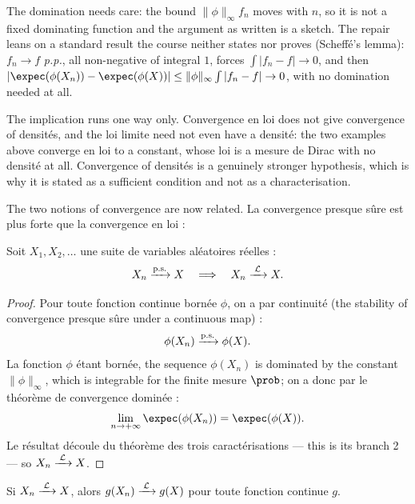 \begin{remark}
  The domination needs care: the bound $\|\phi\|_{\infty} f_{n}$ moves with
  $n$, so it is not a fixed dominating function and the argument as written is a
  sketch. The repair leans on a standard result the course neither states nor
  proves (Scheffé's lemma): $f_{n} \to f$ \textit{p.p.}, all non-negative of
  integral $1$, forces $\int |f_{n} - f| \to 0$, and then
  $|\expec(\phi(X_{n})) - \expec(\phi(X))| \leq \|\phi\|_{\infty}
  \int |f_{n} - f| \to 0$, with no domination needed at all.
\end{remark}

\begin{remark}
  The implication runs one way only. Convergence en loi does not give
  convergence of densités, and the loi limite need not even have a densité: the
  two examples above converge en loi to a constant, whose loi
  is a mesure de Dirac
  with no densité at all. Convergence of densités is a genuinely stronger
  hypothesis, which is why it is stated as a sufficient condition and not as a
  characterisation.
\end{remark}

The two notions of convergence are now related. La convergence presque sûre est
plus forte que la convergence en loi :

\begin{theorem}
  Soit $X_{1}, X_{2}, \dots$ une suite de variables aléatoires réelles :
  \[
    X_{n} \xrightarrow{\text{p.s.}} X \quad \Longrightarrow \quad X_{n} \xrightarrow{\;\mathcal{L}\;} X .
  \]
\end{theorem}

\begin{proof}
  Pour toute fonction continue bornée $\phi$, on a par continuité (the
  stability of convergence presque sûre under a continuous map) :
  \[
    \phi(X_{n}) \xrightarrow{\text{p.s.}} \phi(X) .
  \]
  La fonction $\phi$ étant bornée, the sequence $\phi(X_{n})$ is dominated by
  the constant $\|\phi\|_{\infty}$, which is integrable for the finite mesure
  $\prob$; on a donc par le théorème de convergence dominée :
  \[
    \lim_{n \to +\infty} \expec(\phi(X_{n})) = \expec(\phi(X)) .
  \]
  Le résultat découle du théorème des trois caractérisations --- this is its
  branch 2 --- so $X_{n} \xrightarrow{\;\mathcal{L}\;} X$.
\end{proof}

\begin{prop}
  Si $X_{n} \xrightarrow{\;\mathcal{L}\;} X$, alors $g(X_{n}) \xrightarrow{\;\mathcal{L}\;} g(X)$ pour toute fonction
  continue $g$.
\end{prop}

